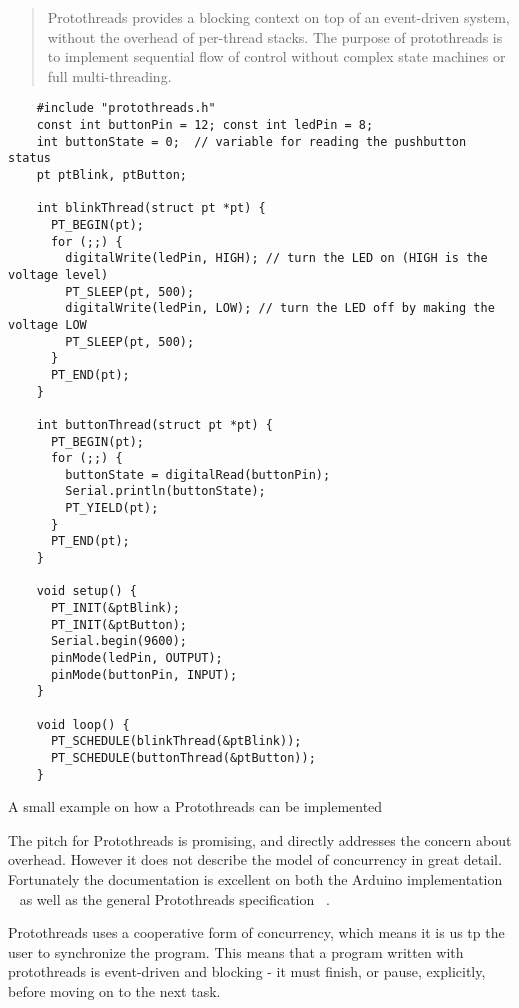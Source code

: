 \blockcquote{Artin2020, AdamDunkelProtothreads}{Protothreads provides a blocking context on top of an event-driven system, without the overhead of per-thread stacks. The purpose of protothreads is to implement sequential flow of control without complex state machines or full multi-threading.}


\begin{listing}[htb!]
  \centering
  \begin{verbatim}
    #include "protothreads.h"
    const int buttonPin = 12; const int ledPin = 8;
    int buttonState = 0;  // variable for reading the pushbutton status
    pt ptBlink, ptButton;

    int blinkThread(struct pt *pt) {
      PT_BEGIN(pt);
      for (;;) {
        digitalWrite(ledPin, HIGH); // turn the LED on (HIGH is the voltage level)
        PT_SLEEP(pt, 500);
        digitalWrite(ledPin, LOW); // turn the LED off by making the voltage LOW
        PT_SLEEP(pt, 500);
      }
      PT_END(pt);
    }

    int buttonThread(struct pt *pt) {
      PT_BEGIN(pt);
      for (;;) {
        buttonState = digitalRead(buttonPin);
        Serial.println(buttonState);
        PT_YIELD(pt);
      }
      PT_END(pt);
    }

    void setup() {
      PT_INIT(&ptBlink);
      PT_INIT(&ptButton);
      Serial.begin(9600);
      pinMode(ledPin, OUTPUT);
      pinMode(buttonPin, INPUT);
    }

    void loop() {
      PT_SCHEDULE(blinkThread(&ptBlink));
      PT_SCHEDULE(buttonThread(&ptButton));
    }
  \end{verbatim}
  \caption{A small example on how a Protothreads can be implemented}
  \label{lst:protothreadsexample}
\end{listing}


The pitch for Protothreads is promising, and directly addresses the concern about overhead. However it does not describe the model of concurrency in great detail. Fortunately the documentation is excellent on both the Arduino implementation ~\cite{Artin2020} as well as the general Protothreads specification ~\cite{AdamDunkelProtothreads}.

Protothreads uses a cooperative form of concurrency, which means it is us tp the user to synchronize the program. This means that a program written with protothreads is event-driven and blocking - it must finish, or pause, explicitly, before moving on to the next task.


